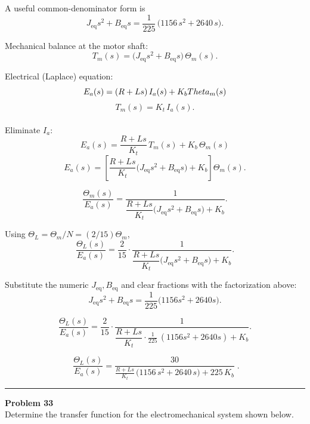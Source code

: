A useful common-denominator form is
\[
J_{\text{eq}}s^2+B_{\text{eq}}s
=\frac{1}{225}\,\Big(1156\,s^2+2640\,s\Big).
\]

Mechanical balance at the motor shaft:
\[
T_m(s)=\big(J_{\text{eq}}s^2+B_{\text{eq}}s\big)\,\Theta_m(s).
\]

Electrical (Laplace) equation:
\[
E_a(s)=(R+Ls)\,I_a(s)+K_b\\Theta_m(s)
\]
\[
T_m(s)=K_t\,I_a(s).
\] \\

Eliminate \(I_a\):
\[
E_a(s)=\frac{R+Ls}{K_t}\,T_m(s)+K_b\,\Theta_m(s)
\]
\[
E_a(s)=\left[\frac{R+Ls}{K_t}\big(J_{\text{eq}}s^2+B_{\text{eq}}s\big)+K_b\right]\Theta_m(s).
\]

\[
\frac{\Theta_m(s)}{E_a(s)}=
\frac{1}{\dfrac{R+Ls}{K_t}\big(J_{\text{eq}}s^2+B_{\text{eq}}s\big)+K_b}.
\]

Using \(\Theta_L=\Theta_m/N=(2/15)\Theta_m\),
\[
\frac{\Theta_L(s)}{E_a(s)}
=\frac{2}{15}\cdot
\frac{1}{\dfrac{R+Ls}{K_t}\big(J_{\text{eq}}s^2+B_{\text{eq}}s\big)+K_b}.
\]

Substitute the numeric \(J_{\text{eq}},B_{\text{eq}}\) and clear fractions with the factorization above:
\[
J_{\text{eq}}s^2+B_{\text{eq}}s=\frac{1}{225}\big(1156s^2+2640s\big).
\]

\[
\frac{\Theta_L(s)}{E_a(s)}
=\frac{2}{15}\cdot
\frac{1}{\dfrac{R+Ls}{K_t}\cdot\frac{1}{225}\,(1156s^2+2640s)+K_b}.
\]

\[
\boxed{\;
\frac{\Theta_L(s)}{E_a(s)}
=\frac{30}{\displaystyle \frac{R+Ls}{K_t}\,\big(1156\,s^2+2640\,s\big)+225\,K_b}\; }.
\]


\newpage

\noindent\rule{\textwidth}{1pt}
\noindent\textbf{Problem 33} \hfill
\\ Determine the transfer function for the electromechanical system shown below.

